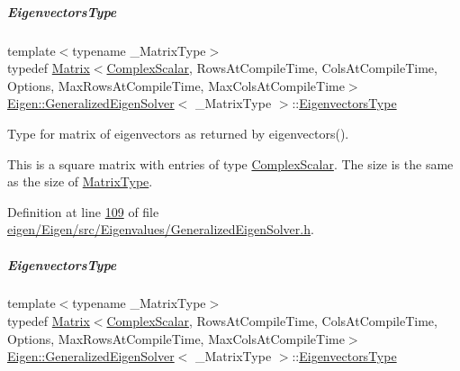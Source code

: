 \mbox{\label{group___eigenvalues___module_afffec018dbb2d87b4c09b6acecbb79cd}} 
\subparagraph{\texorpdfstring{Eigenvectors\+Type}{EigenvectorsType}\hspace{0.1cm}{\footnotesize\ttfamily [1/2]}}
{\footnotesize\ttfamily template$<$typename \+\_\+\+Matrix\+Type$>$ \\
typedef \hyperlink{group___core___module_class_eigen_1_1_matrix}{Matrix}$<$\hyperlink{group___eigenvalues___module_abdec07af91db1345bb4c74066e3d0ea7}{Complex\+Scalar}, Rows\+At\+Compile\+Time, Cols\+At\+Compile\+Time, Options, Max\+Rows\+At\+Compile\+Time, Max\+Cols\+At\+Compile\+Time$>$ \hyperlink{group___eigenvalues___module_class_eigen_1_1_generalized_eigen_solver}{Eigen\+::\+Generalized\+Eigen\+Solver}$<$ \+\_\+\+Matrix\+Type $>$\+::\hyperlink{group___eigenvalues___module_afffec018dbb2d87b4c09b6acecbb79cd}{Eigenvectors\+Type}}



Type for matrix of eigenvectors as returned by eigenvectors(). 

This is a square matrix with entries of type \hyperlink{group___eigenvalues___module_abdec07af91db1345bb4c74066e3d0ea7}{Complex\+Scalar}. The size is the same as the size of \hyperlink{group___eigenvalues___module_a56f4b9823bb9a267de3aaf48428cd247}{Matrix\+Type}. 

Definition at line \hyperlink{eigen_2_eigen_2src_2_eigenvalues_2_generalized_eigen_solver_8h_source_l00109}{109} of file \hyperlink{eigen_2_eigen_2src_2_eigenvalues_2_generalized_eigen_solver_8h_source}{eigen/\+Eigen/src/\+Eigenvalues/\+Generalized\+Eigen\+Solver.\+h}.

\mbox{\label{group___eigenvalues___module_afffec018dbb2d87b4c09b6acecbb79cd}} 
\subparagraph{\texorpdfstring{Eigenvectors\+Type}{EigenvectorsType}\hspace{0.1cm}{\footnotesize\ttfamily [2/2]}}
{\footnotesize\ttfamily template$<$typename \+\_\+\+Matrix\+Type$>$ \\
typedef \hyperlink{group___core___module_class_eigen_1_1_matrix}{Matrix}$<$\hyperlink{group___eigenvalues___module_abdec07af91db1345bb4c74066e3d0ea7}{Complex\+Scalar}, Rows\+At\+Compile\+Time, Cols\+At\+Compile\+Time, Options, Max\+Rows\+At\+Compile\+Time, Max\+Cols\+At\+Compile\+Time$>$ \hyperlink{group___eigenvalues___module_class_eigen_1_1_generalized_eigen_solver}{Eigen\+::\+Generalized\+Eigen\+Solver}$<$ \+\_\+\+Matrix\+Type $>$\+::\hyperlink{group___eigenvalues___module_afffec018dbb2d87b4c09b6acecbb79cd}{Eigenvectors\+Type}}



